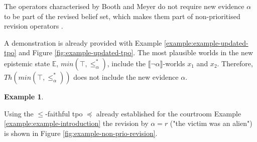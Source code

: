 \documentclass[english, 12pt]{scrartcl}
\theoremstyle{definition}
\newtheorem{example}{Example}
\theoremstyle{definition}
\theoremstyle{definition}
\newcommand{\modelsOf}[1]{\llbracket #1 \rrbracket}
\begin{document}
The operators characterised by Booth and Meyer do not require new evidence $\alpha$ to be part of the revised belief set, which makes them part of non-prioritised revision operators \cite{Hansson1999}.

A demonstration is already provided with Example \ref{example:example-updated-tpo} and Figure \ref{fig:example-updated-tpo}. The most plausible worlds in the new epistemic state $\mathbb{E}$, $min(\top, \leq_{\alpha}^{\ast})$, include the $\modelsOf{\neg\alpha}$-worlds $x_{1}$ and $x_{2}$. Therefore, $Th(min(\top, \leq_{\alpha}^{\ast}))$ does not include the new evidence $\alpha$.

\begin{example}
    \label{example:example-non-prio-revision} 
    
    Using the $\leq$-faithful tpo $\preceq$ already established for the courtroom Example \ref{example:example-introduction} the revision by $\alpha = r$ ("the victim was an alien") is shown in Figure \ref{fig:example-non-prio-revision}.
    \begin{figure}[H]
            \centering
\end{figure}
\end{example}
\end{document}
